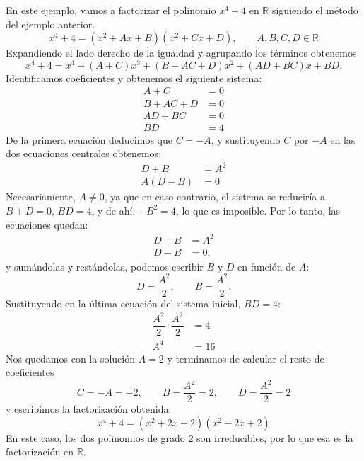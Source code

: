\begin{ejemplo}\label{ej:factorR}
En este ejemplo, vamos a factorizar el polinomio $x^4+4$ en $\mathbb{R}$ siguiendo el método del ejemplo anterior.
\[
x^4+4=(x^2+Ax+B)(x^2+Cx+\mathit{D}),\qquad
A,B,C,D\in\mathbb{R}
\]
Expandiendo el lado derecho de la igualdad y agrupando los términos obtenemos
\[
x^4+4=
x^4+(A+C)x^3+(B+AC+\mathit{D})x^2+(A\mathit{D}+BC)x+B\mathit{D}.
\]
Identificamos coeficientes y obtenemos el siguiente sistema:
\begin{align*}
A+C&=0\\
B+AC+\mathit{D}&=0\\
A\mathit{D}+BC&=0\\
B\mathit{D}&=4
\end{align*}
De la primera ecuación deducimos que $C=-A$, y sustituyendo $C$ por $-A$ en las dos ecuaciones centrales obtenemos:
\begin{align*}
\mathit{D}+B&=A^2\\
A(\mathit{D}-B)&=0
\end{align*}
Necesariamente, $A\ne 0$, ya que en caso contrario, el sistema se reduciría a $B+D=0$, $BD=4$, y de ahí: $-B^2=4$, lo que es imposible.
Por lo tanto, las ecuaciones quedan:
\begin{align*}
\mathit{D}+B&=A^2\\
\mathit{D}-B &=0;
\end{align*}
y sumándolas y restándolas, podemos escribir $B$ y $\mathit D$ en función de $A$: 
\[
\mathit{D} = \dfrac{A^2}2,\qquad
B = \dfrac{A^2}2.
\]
Sustituyendo en la última ecuación del sistema inicial, $B\mathit{D}=4$:
\begin{align*}
\dfrac{A^2}2\cdot\dfrac{A^2}2 &=4\\
A^4 &=16
\end{align*}
Nos quedamos con la solución $A=2$ y terminamos de calcular el resto de coeficientes
\[
C=-A=-2,\qquad B= \dfrac{A^2}2= 2,\qquad D=\dfrac{A^2}2= 2
\]
y escribimos la factorización obtenida:
\[
x^4+4=(x^2+2x+2)(x^2-2x+2)
\]
En este caso, los dos polinomios de grado 2 son irreducibles, por lo que esa es la factorización en $\mathbb{R}$.\fej
\end{ejemplo}

